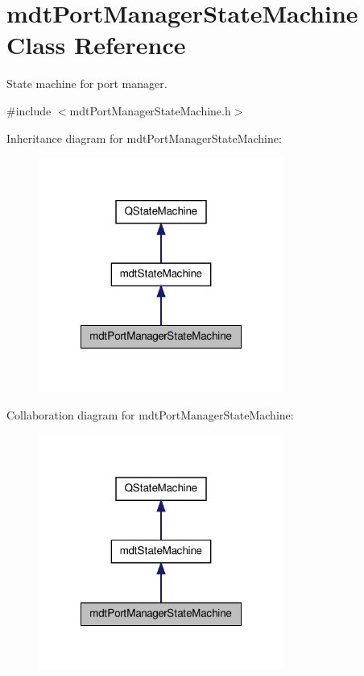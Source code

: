 \hypertarget{classmdt_port_manager_state_machine}{\section{mdt\-Port\-Manager\-State\-Machine Class Reference}
\label{classmdt_port_manager_state_machine}
}


State machine for port manager.  




{\ttfamily \#include $<$mdt\-Port\-Manager\-State\-Machine.\-h$>$}



Inheritance diagram for mdt\-Port\-Manager\-State\-Machine\-:\nopagebreak
\begin{figure}[H]
\begin{center}
\leavevmode
\includegraphics[width=228pt]{classmdt_port_manager_state_machine__inherit__graph}
\end{center}
\end{figure}


Collaboration diagram for mdt\-Port\-Manager\-State\-Machine\-:\nopagebreak
\begin{figure}[H]
\begin{center}
\leavevmode
\includegraphics[width=228pt]{classmdt_port_manager_state_machine__coll__graph}
\end{center}
\end{figure}
